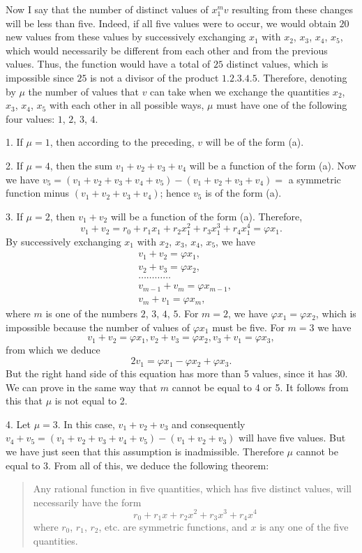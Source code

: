 \documentclass[oneside, 12 pt, leqno]{memoir}
\begin{document}
Now I say that the number of distinct values of \(x_1^m v\) resulting from these changes will be less than five. Indeed, if all five values were to occur, we would obtain \(20\) new values from these values by successively exchanging \(x_1\) with \(x_2\), \(x_3\), \(x_4\), \(x_5\), which would necessarily be different from each other and from the previous values. Thus, the function would have a total of \(25\) distinct values, which is impossible since \(25\) is not a divisor of the product \(1 . 2 . 3 . 4 . 5\). Therefore, denoting by \({\mu}\) the number of values that \(v\) can take when we exchange the quantities \(x_2\), \(x_3\), \(x_4\), \(x_5\) with each other in all possible ways, \(\mu\) must have one of the following four values: \(1\), \(2\), \(3\), \(4\).

1. If \(\mu=1\), then according to the preceding, \(v\) will be of the form (a).

2. If \(\mu=4\), then the sum \(v_1+v_2+v_3+v_4\) will be a function of the form (a). Now we have \(v_5=\left(v_1+v_2+v_3+v_4+v_5\right)-\left(v_1+v_2+v_3+v_4\right)=\) a symmetric function minus \(\left(v_1+v_2+v_3+v_4\right)\); hence \(v_5\) is of the form (a).

3. If \(\mu=2\), then \(v_1+v_2\) will be a function of the form (a). Therefore,
\[v_1+v_2=r_0+r_1 x_1+r_2 x_1^2+r_3 x_1^3+r_4 x_1^4=\varphi x_1.\]
By successively exchanging \(x_1\) with \(x_2\), \(x_3\), \(x_4\), \(x_5\), we have
\[\begin{aligned}
& v_1+v_2=\varphi x_1, \\
& v_2+v_3=\varphi x_2, \\
& \dots \dots \dots \dots \\
& v_{m-1}+v_m=\varphi x_{m-1}, \\
& v_m+v_1=\varphi x_m,
\end{aligned}\]
where \(m\) is one of the numbers \(2\), \(3\), \(4\), \(5\). For \(m=2\), we have \(\varphi x_1=\varphi x_2\), which is impossible because the number of values of \(\varphi x_1\) must be five. For \(m=3\) we have
\[v_1+v_2=\varphi x_1,  v_2+v_3=\varphi x_2,  v_3+v_1=\varphi x_3,\]
from which we deduce
\[2 v_1=\varphi x_1-\varphi x_2+\varphi x_3.\]
But the right hand side of this equation has more than 5 values, since it has 30. We can prove in the same way that \(m\) cannot be equal to 4 or 5. It follows from this that \(\mu\) is not equal to 2.

4. Let \(\mu=3\). In this case, \(v_1+v_2+v_3\) and consequently \(v_4+v_5 = \left(v_1+v_2+v_3+v_4+v_5\right)-\left(v_1+v_2+v_3\right)\) will have five values. But we have just seen that this assumption is inadmissible. Therefore \(\mu\) cannot be equal to 3. From all of this, we deduce the following theorem:
\begin{quote}Any rational function in five quantities, which has five distinct values, will necessarily have the form
\[r_0+r_1 x+r_2 x^2+r_3 x^3+r_4 x^4\]
where \(r_0\), \(r_1\), \(r_2\), etc. are symmetric functions, and \(x\) is any one of the five quantities.\end{quote}
\end{document}
